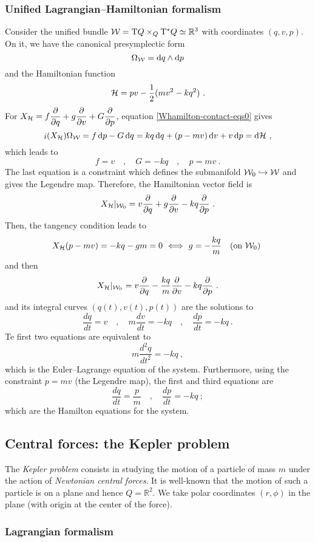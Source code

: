 \documentclass[12pt]{report}
\def\derpar#1#2{\frac{\partial{#1}}{\partial{#2}}}
\def\d{{\rm d}}
\def\Real{\mathbb{R}}
\def\Tan{{\rm T}}
\def\inn{\mathop{i}\nolimits}
\begin{document}
\subsubsection{Unified Lagrangian--Hamiltonian formalism}


Consider the unified bundle ${\cal W}=\Tan Q\times_Q\Tan^*Q\simeq\Real^3$
with coordinates $(q,v,p)$. On it, we have the canonical presymplectic form
$$
\Omega_{\cal W}=\d q\wedge\d p 
$$
and the Hamiltonian function
$$
{\cal H}=pv-\frac{1}{2}(mv^2-kq^2) \ .
$$
For $\displaystyle X_{\cal H}=f\derpar{}{q}+g\derpar{}{v}+G\derpar{}{p}$,
equation \eqref{Whamilton-contact-eqs0} gives
$$
\inn(X_{\cal H})\Omega_{\cal W}= f\, \d p-G\, \d q=
kq\, \d q+(p-mv)\,\d v+v\, \d p=\d{\cal H}\ ,
$$
which leads to
$$
f=v \quad , \quad G=-kq \quad , \quad p=mv  \ .
$$
The last equation is a constraint which defines the submanifold
${\cal W}_0\hookrightarrow{\cal W}$ and gives the Legendre map.
Therefore, the Hamiltonian vector field is
$$
X_{\cal H}\vert_{{\cal W}_0}=v\derpar{}{q}+g\derpar{}{v}-kq\derpar{}{p} \ .
$$
Then, the tangency condition leads to
$$
X_{\cal H}(p-mv)=-kq-gm=0 \ \Longleftrightarrow\
g=-\frac{kq}{m} \quad \mbox{\rm (on ${\cal W}_0$)} \ 
$$
and then
$$
X_{\cal H}\vert_{{\cal W}_0}=v\derpar{}{q}-\frac{kq}{m}\derpar{}{v}-kq\derpar{}{p} \ .
$$
and its integral curves $(q(t),v(t),p(t))$ are the solutions to
$$
\frac{dq}{dt}=v \quad , \quad
m\frac{dv}{dt}=-kq \quad , \quad
\frac{dp}{dt}=-kq \ .
$$
Te first two equations are equivalent to
$$
m\frac{d^2q}{dt^2}=-kq \ ,
$$
which is the Euler--Lagrange equation of the system. 
Furthermore, using the constraint $p=mv$ (the Legendre map),
the first and third equations are
$$
\frac{dq}{dt}=\frac{p}{m} \quad , \quad
\frac{dp}{dt}=-kq \ ;
$$
which are the Hamilton equations for the system.


\subsection{Central forces: the Kepler problem}
\label{Kp}


The {\sl Kepler problem} consists in studying 
the motion of a particle of mass $m$
under the action of {\sl Newtonian central forces}.
It is well-known that the motion of such a particle is on a plane and hence
$Q=\Real^2$. We take polar coordinates $(r,\phi)$ in the plane
(with origin at the center of the force).


\subsubsection{Lagrangian formalism}
\end{document}
